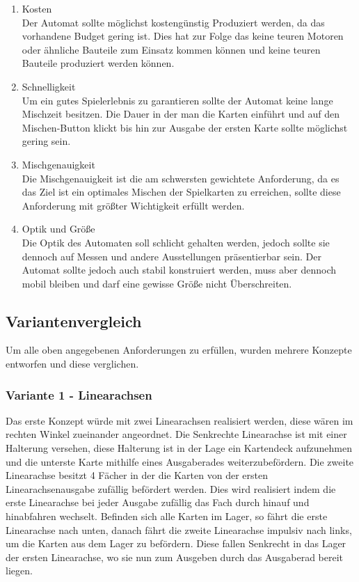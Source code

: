 \begin{enumerate}
    \item Kosten  \\
    Der Automat sollte möglichst kostengünstig Produziert werden,
    da das vorhandene Budget gering ist. Dies hat zur Folge das keine teuren Motoren
    oder ähnliche Bauteile zum Einsatz kommen können und  keine teuren Bauteile produziert
    werden können.
    \item Schnelligkeit \\
    Um ein gutes Spielerlebnis zu garantieren sollte der Automat keine
    lange Mischzeit besitzen. Die Dauer in der man die Karten einführt und auf den
    Mischen-Button klickt bis hin zur Ausgabe der ersten Karte sollte möglichst gering sein.
    \item Mischgenauigkeit \\
    Die Mischgenauigkeit ist die am schwersten gewichtete Anforderung,
    da es das Ziel ist ein optimales Mischen der Spielkarten zu erreichen, sollte
    diese Anforderung mit größter Wichtigkeit erfüllt werden.
    \item Optik und Größe \\
    Die Optik des Automaten soll schlicht gehalten werden, jedoch sollte
    sie dennoch auf Messen und andere Ausstellungen präsentierbar sein. Der Automat
    sollte jedoch auch stabil konstruiert werden, muss aber dennoch mobil bleiben und
    darf eine gewisse Größe nicht Überschreiten.
\end{enumerate}

\subsection{Variantenvergleich}
Um alle oben angegebenen Anforderungen zu erfüllen, wurden mehrere Konzepte entworfen und diese verglichen.
\subsubsection{Variante 1 - Linearachsen}

Das erste Konzept würde mit zwei Linearachsen realisiert werden, diese wären im rechten Winkel zueinander
angeordnet. Die Senkrechte Linearachse ist mit einer Halterung versehen, diese Halterung ist in der Lage
ein Kartendeck aufzunehmen und die unterste Karte mithilfe eines Ausgaberades weiterzubefördern. Die zweite
Linearachse besitzt 4 Fächer in der die Karten von der ersten Linearachsenausgabe zufällig befördert werden.
Dies wird realisiert indem die erste Linearachse bei jeder Ausgabe zufällig das Fach durch hinauf und
hinabfahren wechselt. Befinden sich alle Karten im Lager, so fährt die erste Linearachse nach unten, danach
fährt die zweite Linearachse impulsiv nach links, um die Karten aus dem Lager zu befördern. Diese fallen
Senkrecht in das Lager der ersten Linearachse, wo sie nun zum Ausgeben durch das Ausgaberad bereit liegen.

